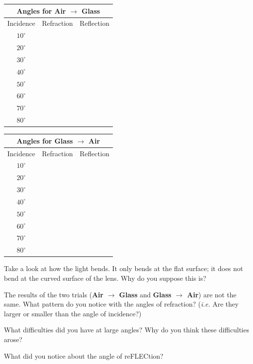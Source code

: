\documentclass[10pt]{exam}
\begin{document}
\begin{multicols}{2}
  \begin{tabular}{|c|c|c|}
    \hline
    \multicolumn{3}{|c|}{Angles for {\bf Air $\rightarrow$ Glass}} 
    \\\hline
    Incidence &
    Refraction &
    Reflection \\\hline
    $10^\circ$ && \\\hline
    $20^\circ$ && \\\hline
    $30^\circ$ && \\\hline
    $40^\circ$ && \\\hline
    $50^\circ$ && \\\hline
    $60^\circ$ && \\\hline
    $70^\circ$ && \\\hline
    $80^\circ$ && \\\hline
  \end{tabular}

  \columnbreak

  \begin{tabular}{|c|c|c|}
    \hline
    \multicolumn{3}{|c|}{Angles for {\bf Glass $\rightarrow$ Air}} 
    \\\hline
    Incidence &
    Refraction &
    Reflection \\\hline
    $10^\circ$ && \\\hline
    $20^\circ$ && \\\hline
    $30^\circ$ && \\\hline
    $40^\circ$ && \\\hline
    $50^\circ$ && \\\hline
    $60^\circ$ && \\\hline
    $70^\circ$ && \\\hline
    $80^\circ$ && \\\hline
  \end{tabular}


\end{multicols}

\vspace{-1em}
\begin{questions}


  \question
    Take a look at how the light bends.  It only bends at the flat surface; it does not bend at the curved surface of the lens.  Why do you suppose this is? 
    \vs 

  \question
    The results of the two trials ({\bf Air $\rightarrow$ Glass} and {\bf Glass $\rightarrow$ Air}) are not the same.  What pattern do you notice with the angles of refraction? (\emph{i.e.} Are they larger or smaller than the angle of incidence?)
    \vs
  
  \question
    What difficulties did you have at large angles?  Why do you think these difficulties arose?
    \vs 
  
  \question
    What did you notice about the angle of reFLECtion?
    \vs 



\end{questions}
\end{document}

